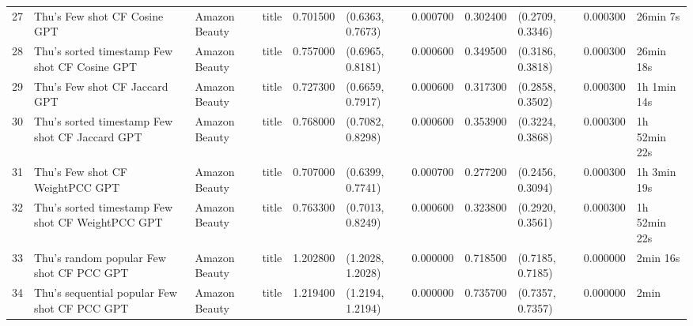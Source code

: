 \begin{tabular}{llllrllrlll}
27 & Thu's Few shot CF Cosine GPT & Amazon Beauty & title & 0.701500 & (0.6363, 0.7673) & 0.000700 & 0.302400 & (0.2709, 0.3346) & 0.000300 & 26min 7s \\
28 & Thu's sorted timestamp Few shot CF Cosine GPT & Amazon Beauty & title & 0.757000 & (0.6965, 0.8181) & 0.000600 & 0.349500 & (0.3186, 0.3818) & 0.000300 & 26min 18s \\
29 & Thu's Few shot CF Jaccard GPT & Amazon Beauty & title & 0.727300 & (0.6659, 0.7917) & 0.000600 & 0.317300 & (0.2858, 0.3502) & 0.000300 & 1h 1min 14s \\
30 & Thu's sorted timestamp Few shot CF Jaccard GPT & Amazon Beauty & title & 0.768000 & (0.7082, 0.8298) & 0.000600 & 0.353900 & (0.3224, 0.3868) & 0.000300 & 1h 52min 22s \\
31 & Thu's Few shot CF WeightPCC GPT & Amazon Beauty & title & 0.707000 & (0.6399, 0.7741) & 0.000700 & 0.277200 & (0.2456, 0.3094) & 0.000300 & 1h 3min 19s \\
32 & Thu's sorted timestamp Few shot CF WeightPCC GPT & Amazon Beauty & title & 0.763300 & (0.7013, 0.8249) & 0.000600 & 0.323800 & (0.2920, 0.3561) & 0.000300 & 1h 52min 22s \\
33 & Thu's random popular Few shot CF PCC GPT & Amazon Beauty & title & 1.202800 & (1.2028, 1.2028) & 0.000000 & 0.718500 & (0.7185, 0.7185) & 0.000000 & 2min 16s \\
34 & Thu's sequential popular Few shot CF PCC GPT & Amazon Beauty & title & 1.219400 & (1.2194, 1.2194) & 0.000000 & 0.735700 & (0.7357, 0.7357) & 0.000000 & 2min \\
\end{tabular}
